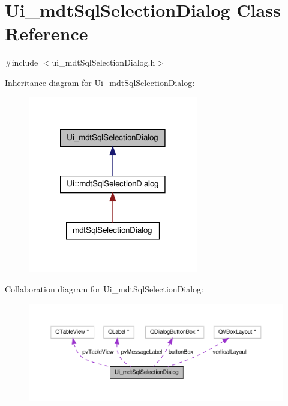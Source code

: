 \hypertarget{class_ui__mdt_sql_selection_dialog}{\section{Ui\-\_\-mdt\-Sql\-Selection\-Dialog Class Reference}
\label{class_ui__mdt_sql_selection_dialog}
}


{\ttfamily \#include $<$ui\-\_\-mdt\-Sql\-Selection\-Dialog.\-h$>$}



Inheritance diagram for Ui\-\_\-mdt\-Sql\-Selection\-Dialog\-:\nopagebreak
\begin{figure}[H]
\begin{center}
\leavevmode
\includegraphics[width=210pt]{class_ui__mdt_sql_selection_dialog__inherit__graph}
\end{center}
\end{figure}


Collaboration diagram for Ui\-\_\-mdt\-Sql\-Selection\-Dialog\-:\nopagebreak
\begin{figure}[H]
\begin{center}
\leavevmode
\includegraphics[width=350pt]{class_ui__mdt_sql_selection_dialog__coll__graph}
\end{center}
\end{figure}
